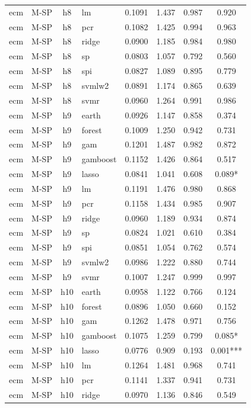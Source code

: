 \begin{ThreePartTable}
\begin{longtable}[t]{llclcccc}
ecm & M-SP & h8 & lm & 0.1091 & 1.437 & 0.987 & 0.920\\
ecm & M-SP & h8 & pcr & 0.1082 & 1.425 & 0.994 & 0.963\\
ecm & M-SP & h8 & ridge & 0.0900 & 1.185 & 0.984 & 0.980\\
ecm & M-SP & h8 & sp & 0.0803 & 1.057 & 0.792 & 0.560\\
ecm & M-SP & h8 & spi & 0.0827 & 1.089 & 0.895 & 0.779\\
ecm & M-SP & h8 & svmlw2 & 0.0891 & 1.174 & 0.865 & 0.639\\
ecm & M-SP & h8 & svmr & 0.0960 & 1.264 & 0.991 & 0.986\\
\addlinespace
ecm & M-SP & h9 & earth & 0.0926 & 1.147 & 0.858 & 0.374\\
ecm & M-SP & h9 & forest & 0.1009 & 1.250 & 0.942 & 0.731\\
ecm & M-SP & h9 & gam & 0.1201 & 1.487 & 0.982 & 0.872\\
ecm & M-SP & h9 & gamboost & 0.1152 & 1.426 & 0.864 & 0.517\\
ecm & M-SP & h9 & lasso & 0.0841 & 1.041 & 0.608 & 0.089*\\
ecm & M-SP & h9 & lm & 0.1191 & 1.476 & 0.980 & 0.868\\
ecm & M-SP & h9 & pcr & 0.1158 & 1.434 & 0.985 & 0.907\\
ecm & M-SP & h9 & ridge & 0.0960 & 1.189 & 0.934 & 0.874\\
ecm & M-SP & h9 & sp & 0.0824 & 1.021 & 0.610 & 0.384\\
ecm & M-SP & h9 & spi & 0.0851 & 1.054 & 0.762 & 0.574\\
ecm & M-SP & h9 & svmlw2 & 0.0986 & 1.222 & 0.880 & 0.744\\
ecm & M-SP & h9 & svmr & 0.1007 & 1.247 & 0.999 & 0.997\\
\addlinespace
ecm & M-SP & h10 & earth & 0.0958 & 1.122 & 0.766 & 0.124\\
ecm & M-SP & h10 & forest & 0.0896 & 1.050 & 0.660 & 0.152\\
ecm & M-SP & h10 & gam & 0.1262 & 1.478 & 0.971 & 0.756\\
ecm & M-SP & h10 & gamboost & 0.1075 & 1.259 & 0.799 & 0.085*\\
ecm & M-SP & h10 & lasso & 0.0776 & 0.909 & 0.193 & 0.001***\\
ecm & M-SP & h10 & lm & 0.1264 & 1.481 & 0.968 & 0.741\\
ecm & M-SP & h10 & pcr & 0.1141 & 1.337 & 0.941 & 0.731\\
ecm & M-SP & h10 & ridge & 0.0970 & 1.136 & 0.846 & 0.549\\

\end{longtable}
\end{ThreePartTable}
